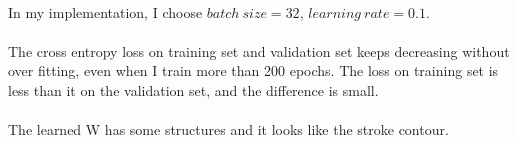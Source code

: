 \documentclass[twoside]{article}
\begin{document}
\paragraph{} In my implementation, I choose $batch\ size = 32$, $learning\ rate = 0.1$.
\paragraph{} The cross entropy loss on training set and validation set keeps decreasing without over fitting, even when I train more than 200 epochs.  The loss on training set is less than it on the validation set, and the difference is small. 
\paragraph{} The learned W has some structures and it looks like the stroke contour. 
\end{document}
